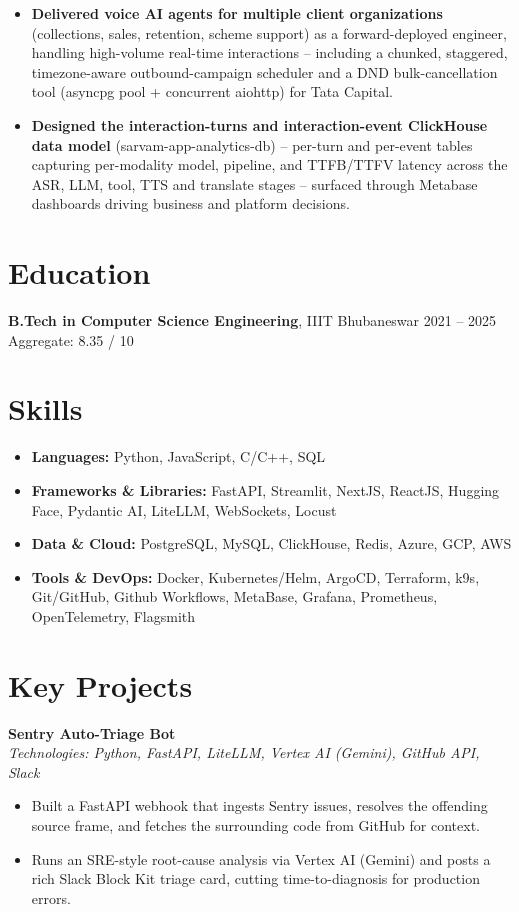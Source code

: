 \documentclass[a4paper,9pt]{extarticle}
\begin{document}
\begin{itemize}[leftmargin=*, labelsep=3pt, itemsep=2pt, topsep=2pt, parsep=0pt]
    \item \textbf{Delivered voice AI agents for multiple client organizations} (collections, sales, retention, scheme support) as a forward-deployed engineer, handling high-volume real-time interactions -- including a chunked, staggered, timezone-aware outbound-campaign scheduler and a DND bulk-cancellation tool (asyncpg pool + concurrent aiohttp) for Tata Capital.
    \item \textbf{Designed the interaction-turns and interaction-event ClickHouse data model} (sarvam-app-analytics-db) -- per-turn and per-event tables capturing per-modality model, pipeline, and TTFB/TTFV latency across the ASR, LLM, tool, TTS and translate stages -- surfaced through Metabase dashboards driving business and platform decisions.
\end{itemize}

\section*{Education}
\textbf{B.Tech in Computer Science Engineering}, IIIT Bhubaneswar \hfill 2021 -- 2025 \\
Aggregate: 8.35 / 10

\section*{Skills}
\begin{itemize}[leftmargin=*, labelsep=3pt, itemsep=2pt, topsep=2pt, parsep=0pt]
    \item \textbf{Languages:} Python, JavaScript, C/C++, SQL
    \item \textbf{Frameworks \& Libraries:} FastAPI, Streamlit, NextJS, ReactJS, Hugging Face, Pydantic AI, LiteLLM, WebSockets, Locust
    \item \textbf{Data \& Cloud:} PostgreSQL, MySQL, ClickHouse, Redis, Azure, GCP, AWS
    \item \textbf{Tools \& DevOps:} Docker, Kubernetes/Helm, ArgoCD, Terraform, k9s, Git/GitHub, Github Workflows, MetaBase, Grafana, Prometheus, OpenTelemetry, Flagsmith
\end{itemize}

\section*{Key Projects}
\textbf{Sentry Auto-Triage Bot} \\[3pt]
\textit{Technologies: Python, FastAPI, LiteLLM, Vertex AI (Gemini), GitHub API, Slack}
\begin{itemize}[leftmargin=*, labelsep=3pt, itemsep=2pt, topsep=2pt, parsep=0pt]
    \item Built a FastAPI webhook that ingests Sentry issues, resolves the offending source frame, and fetches the surrounding code from GitHub for context.
    \item Runs an SRE-style root-cause analysis via Vertex AI (Gemini) and posts a rich Slack Block Kit triage card, cutting time-to-diagnosis for production errors.
\end{itemize}
\end{document}
